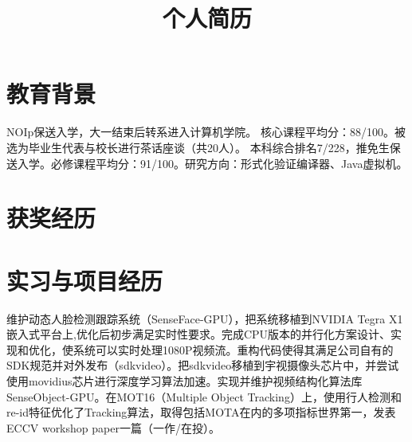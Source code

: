 \documentclass[11pt,a4paper]{moderncv}
\title{个人简历}               %
\begin{document}
\maketitle

\section{教育背景}
{NOIp保送入学，大一结束后转系进入计算机学院。}
{核心课程平均分：88/100。被选为毕业生代表与校长进行茶话座谈（共20人）。}
{本科综合排名7/228，推免生保送入学。必修课程平均分：91/100。研究方向：形式化验证编译器、Java虚拟机。}
\section{获奖经历}
\section{实习与项目经历}
{维护动态人脸检测跟踪系统（SenseFace-GPU），把系统移植到NVIDIA Tegra X1 嵌入式平台上,优化后初步满足实时性要求。完成CPU版本的并行化方案设计、实现和优化，使系统可以实时处理1080P视频流。重构代码使得其满足公司自有的SDK规范并对外发布（sdkvideo）。把sdkvideo移植到宇视摄像头芯片中，并尝试使用movidius芯片进行深度学习算法加速。实现并维护视频结构化算法库SenseObject-GPU。在MOT16（Multiple Object Tracking）上，使用行人检测和re-id特征优化了Tracking算法，取得包括MOTA在内的多项指标世界第一，发表ECCV workshop paper一篇（一作/在投\cite{POI1}）。}  
\end{document}
